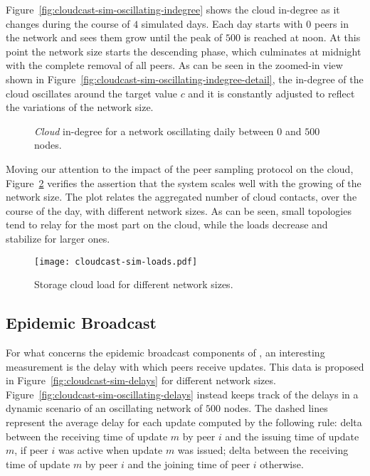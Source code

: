 Figure~\ref{fig:cloudcast-sim-oscillating-indegree} shows the
cloud in-degree as it changes during the course of $4$ simulated
days. Each day starts with $0$ peers in the network and sees them grow
until the peak of $500$ is reached at noon. At this point the network size starts
the descending phase, which culminates at midnight with the complete removal of all
peers. As can be seen in the zoomed-in view shown in
Figure~\ref{fig:cloudcast-sim-oscillating-indegree-detail}, the
in-degree of the cloud oscillates around the target value $c$ and it is
constantly adjusted to reflect the variations of the network size.

\begin{figure}[H]
  \centering
  \caption{\emph{Cloud} in-degree for a network oscillating daily
    between $0$ and $500$ nodes.}
  \label{fig:cloudcast-sim-oscillating-indegree-global}
\end{figure}

Moving our attention to the impact of the peer sampling protocol on
the cloud, Figure~\ref{fig:cloudcast-sim-loads} verifies the assertion
that the system scales well with the growing of the network size. The
plot relates the aggregated number of cloud contacts, over the course
of the day, with different network sizes. As can be seen, small topologies
tend to relay for the most part on the cloud, while the loads
decrease and stabilize for larger ones.

\begin{figure}[H]
  \centering
  \texttt{[image: cloudcast-sim-loads.pdf]}
  \caption{Storage cloud load for different network sizes.}
  \label{fig:cloudcast-sim-loads}
\end{figure}

\subsection{Epidemic Broadcast}
For what concerns the epidemic broadcast components of
\cloudcast, an interesting measurement is the delay with which peers
receive updates. This data is proposed in
Figure~\ref{fig:cloudcast-sim-delays} for different network sizes.
Figure~\ref{fig:cloudcast-sim-oscillating-delays} instead keeps track
of the delays in a dynamic scenario of an oscillating network of
$500$ nodes. The dashed lines represent the average delay for each
update computed by the following rule: delta between the receiving
time of update $m$ by peer $i$ and the issuing time of update $m$, if
peer $i$ was active when update $m$ was issued; delta between the
receiving time of update $m$ by peer $i$ and the joining time of peer
$i$ otherwise.

